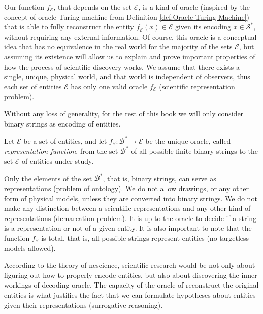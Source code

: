 Our function $f_\mathcal{E}$, that depends on the set $\mathcal{E}$, is a kind of oracle (inspired by the concept of oracle Turing machine from Definition \ref{def:Oracle-Turing-Machine}) that is able to fully reconstruct the entity $f_\mathcal{E} (x) \in \mathcal{E}$ given its encoding $x \in \mathcal{S}^\ast$, without requiring any external information. Of course, this oracle is a conceptual idea that has no equivalence in the real world for the majority of the sets $\mathcal{E}$, but assuming its existence will allow us to explain and prove important properties of how the process of scientific discovery works. We assume that there exists a single, unique, physical world, and that world is independent of observers, thus each set of entities $\mathcal{E}$ has only one valid oracle $f_\mathcal{E}$ (scientific representation problem).

Without any loss of generality, for the rest of this book we will only consider binary strings as encoding of entities.

\begin{definition}
\label{def:descriptions_topic}
Let $\mathcal{E}$ be a set of entities, and let $f_\mathcal{E}:\mathcal{B}^\ast \rightarrow \mathcal{E}$ be the unique oracle, called \emph{representation function}, from the set $\mathcal{B}^\ast$ of all possible finite binary strings to the set $\mathcal{E}$ of entities under study.
\end{definition}

Only the elements of the set $\mathcal{B}^\ast$, that is, binary strings, can serve as representations (problem of ontology). We do not allow drawings, or any other form of physical models, unless they are converted into binary strings. We do not make any distinction between a scientific representations and any other kind of representations (demarcation problem). It is up to the oracle to decide if a string is a representation or not of a given entity. It is also important to note that the function $f_\mathcal{E}$ is total, that is, all possible strings represent entities (no targetless models allowed).

According to the theory of nescience, scientific research would be not only about figuring out how to properly encode entities, but also about discovering the inner workings of decoding oracle. The capacity of the oracle of reconstruct the original entities is what justifies the fact that we can formulate hypotheses about entities given their representations (surrogative reasoning).

